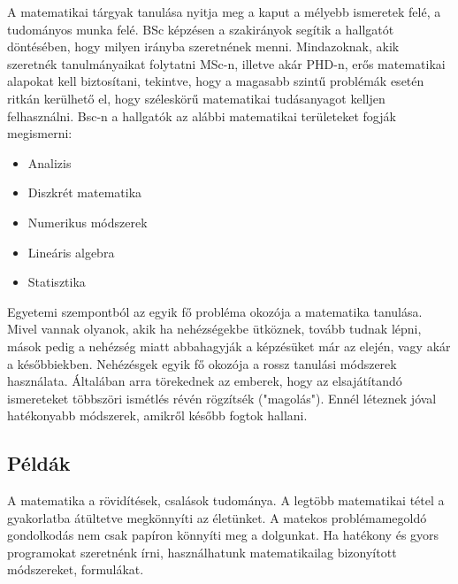 \documentclass[../Main.tex]{subfiles}
\begin{document}
\begin{flushleft}
A matematikai tárgyak tanulása nyitja meg a kaput a mélyebb ismeretek felé, a tudományos munka felé.
BSc képzésen a szakirányok segítik a hallgatót döntésében, hogy milyen irányba szeretnének menni.
Mindazoknak, akik szeretnék tanulmányaikat folytatni MSc-n, illetve akár PHD-n,
erős matematikai alapokat kell biztosítani, tekintve, hogy a magasabb szintű problémák esetén ritkán kerülhető el,
hogy széleskörű matematikai tudásanyagot kelljen felhasználni. Bsc-n a hallgatók az alábbi 
matematikai területeket fogják megismerni:

\begin{itemize}
    \item Analizis
    \item Diszkrét matematika
    \item Numerikus módszerek
    \item Lineáris algebra
    \item Statisztika
\end{itemize}

\end{flushleft}

\begin{flushleft}
    Egyetemi szempontból az egyik fő probléma okozója a matematika tanulása.
    Mivel vannak olyanok, akik ha nehézségekbe ütköznek, tovább tudnak lépni,
    mások pedig a nehézség miatt abbahagyják a képzésüket már az elején, vagy akár a későbbiekben.
    Nehézésgek egyik fő okozója a rossz tanulási módszerek használata.
    Általában arra törekednek az emberek, hogy az elsajátítandó ismereteket többszöri ismétlés
    révén rögzítsék ("magolás"). Ennél léteznek jóval hatékonyabb módszerek, amikről később fogtok hallani.
\end{flushleft}

\subsection{Példák}

\begin{flushleft}
A matematika a rövidítések, csalások tudománya.
A legtöbb matematikai tétel a gyakorlatba átültetve megkönnyíti az életünket.
A matekos problémamegoldó gondolkodás nem csak papíron könnyíti meg a dolgunkat.
Ha hatékony és gyors programokat szeretnénk írni, használhatunk matematikailag bizonyított módszereket, formulákat.
\end{flushleft}
\end{document}
